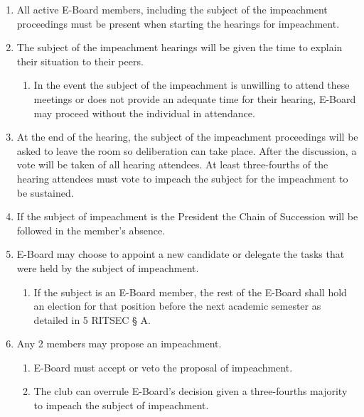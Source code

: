 \documentclass{article}
\begin{document}
\begin{enumerate}
  \item All active E-Board members, including the subject of the impeachment
    proceedings must be present when starting the hearings for impeachment.
  \item The subject of the impeachment hearings will be given the time to
    explain their situation to their peers.
  \begin{enumerate}
    \item In the event the subject of the impeachment is unwilling to attend
      these meetings or does not provide an adequate time for their hearing,
      E-Board may proceed without the individual in attendance.
  \end{enumerate}
  \item At the end of the hearing, the subject of the impeachment proceedings
    will be asked to leave the room so deliberation can take place. After the
    discussion, a vote will be taken of all hearing attendees. At least
    three-fourths of the hearing attendees must vote to impeach the subject for
    the impeachment to be sustained.
  \item If the subject of impeachment is the President the Chain of Succession
    will be followed in the member’s absence.
  \item E-Board may choose to appoint a new candidate or delegate the tasks
    that were held by the subject of impeachment.
  \begin{enumerate}
    \item If the subject is an E-Board member, the rest of the E-Board shall
      hold an election for that position before the next academic semester as
      detailed in 5 RITSEC § A.
  \end{enumerate}
  \item Any 2 members may propose an impeachment.
  \begin{enumerate}
    \item E-Board must accept or veto the proposal of impeachment.
    \item The club can overrule E-Board's decision given a three-fourths
      majority to impeach the subject of impeachment.
  \end{enumerate}
\end{enumerate}

\end{document}
